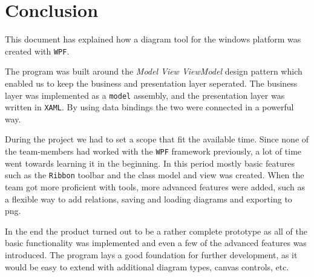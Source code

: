 \section{Conclusion}

This document has explained how a diagram tool for the windows platform was
created with \texttt{WPF}. 

The program was built around the \textit{Model View ViewModel} design pattern
which enabled us to keep the business and presentation layer seperated. The
business layer was implemented as a \texttt{model} assembly, and the
presentation layer was written in \texttt{XAML}. By using data bindings the two
were connected in a powerful way. 

During the project we had to set a scope that fit the available time. Since none
of the team-members had worked with the \texttt{WPF} framework previously, a lot
of time went towards learning it in the beginning. In this period mostly basic
features such as the \texttt{Ribbon} toolbar and the class model and view was
created. When the team got more proficient with tools, more advanced features
were added, such as a flexible way to add relations, saving and loading diagrams
and exporting to png. 

In the end the product turned out to be a rather complete prototype as all of
the basic functionality was implemented and even a few of the advanced features
was introduced. The program lays a good foundation for further development, as
it would be easy to extend with additional diagram types, canvas controls, etc.
